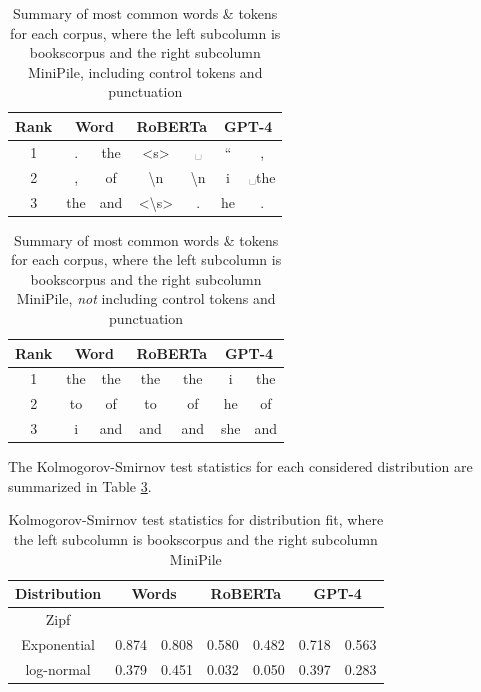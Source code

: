 \documentclass[11pt]{article}
\begin{document}
\begin{table}
    \centering
    \begin{tabular}{|c|c|c|c|c|c|c|}
        \hline
        \textbf{Rank} & \multicolumn{2}{c|}{\textbf{Word}} & \multicolumn{2}{c|}{\textbf{RoBERTa}} & \multicolumn{2}{c|}{\textbf{GPT-4}}  \\
        \hline
        1 & . & the & <s> & ␣ & `` & , \\
        \hline
        2 & , & of & \textbackslash n & \textbackslash n & i & ␣the \\
        \hline
        3 & the & and & <\textbackslash s> & . & he & . \\
        \hline
    \end{tabular}
    \caption{Summary of most common words \& tokens for each corpus, where the left subcolumn is bookscorpus and the right subcolumn MiniPile, including control tokens and punctuation}
    \label{tbl:token ranks}
\end{table}

\begin{table}
    \centering
    \begin{tabular}{|c|c|c|c|c|c|c|}
        \hline
        \textbf{Rank} & \multicolumn{2}{c|}{\textbf{Word}} & \multicolumn{2}{c|}{\textbf{RoBERTa}} & \multicolumn{2}{c|}{\textbf{GPT-4}}  \\
        \hline
        1 & the & the & the & the & i & the \\
        \hline
        2 & to & of & to & of & he & of \\
        \hline
        3 & i & and & and & and & she & and \\
        \hline
    \end{tabular}
    \caption{Summary of most common words \& tokens for each corpus, where the left subcolumn is bookscorpus and the right subcolumn MiniPile, \textit{not} including control tokens and punctuation}
    \label{tbl:token ranks no control}
\end{table}

The Kolmogorov-Smirnov test statistics for each considered distribution are summarized in Table \ref{tbl:kstest}.

\begin{table}
    \centering
    \begin{tabular}{|c|c|c|c|c|c|c|}
        \hline
        \textbf{Distribution} & \multicolumn{2}{c|}{\textbf{Words}} & \multicolumn{2}{c|}{\textbf{RoBERTa}} & \multicolumn{2}{c|}{\textbf{GPT-4}}  \\
        \hline
        Zipf &  &  &  &  &  &  \\
        \hline
        Exponential & 0.874 & 0.808 & 0.580 & 0.482 & 0.718 & 0.563 \\
        \hline
        log-normal & 0.379 & 0.451 & 0.032 & 0.050 & 0.397 & 0.283 \\
        \hline
    \end{tabular}
    \caption{Kolmogorov-Smirnov test statistics for distribution fit, where the left subcolumn is bookscorpus and the right subcolumn MiniPile}
    \label{tbl:kstest}
\end{table}
\end{document}
